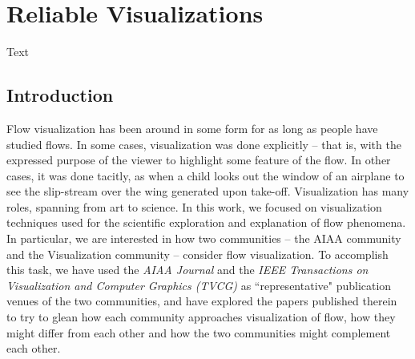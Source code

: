 \chapter{Reliable Visualizations}\label{chap5}

Text

\section{Introduction}

Flow visualization has been around in some form for as long as people have studied flows.  In some
cases, visualization was done explicitly -- that is, with the expressed purpose of the viewer to highlight
some feature of the flow.  In other cases, it was done tacitly, as when a child looks out the window
of an airplane to see the slip-stream over the wing generated upon take-off.  Visualization has
many roles, spanning from art to science.  In this work, we focused on visualization techniques
used for the scientific exploration and explanation of flow phenomena.  In particular, we are interested
in how two communities -- the AIAA community and the Visualization community -- consider
flow visualization.  To accomplish this task, we have used the {\em AIAA Journal} and the
{\em IEEE Transactions on Visualization and Computer Graphics (TVCG)} as ``representative" publication
venues of the two communities, and have explored the papers published therein to try to 
glean how each community approaches visualization of flow, how they might differ from each other 
and how the two communities might complement each other. 

